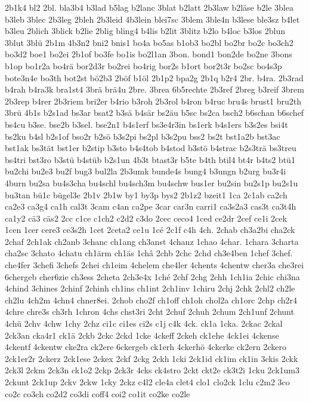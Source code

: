 {2b1k4
bl2
2bl.
bla3b4
b3lad
b5lag
b2lanc
3blat
b2latt
2b3law
b2läse
b2le
3blea
b3leb
3blec
2b3leg
2bleh
2b3leid
4b3lein
blei7sc
3blem
3ble4n
b3lese
ble3sz
b4let
b3leu
2blich
3blick
b2lie
2blig
bling4
b4lis
b2lit
3blitz
b2lo
b4loc
b3los
2blun
3blut
3blü
2b1m
4b3n2
bni2
bnis1
bo4a
bo5as
b1ob3
bo2bl
bo2br
bo2c
bo3ch2
bo3d2
boe1
bo2ei
2b1of
bo3fe
bo1is
bo2l1an
3bon.
bond1
bon2de
bo2ne
3bons
b1op
bo1r2a
bo4rä
bor2d3r
bo2rei
bo4rig
bor2s
b1ort
bor2t3r
bo2sc
bo4s3p
bote3n4e
bo3th
bot2st
bö2b3
2böf
b1öl
2b1p2
bpa2g
2b1q
b2r4
2br.
b4ra.
2b3rad
b4rah
b4ra3k
bra1st4
3brä
brä4u
2bre.
3brea
6b5rechte
2b3ref
2breg
b3reif
3brem
2b3rep
b4rer
2b3riem
bri2er
b4rio
b3roh
2b3rol
b4ron
b4ruc
bru4s
brust1
bru2th
3brü
4b1s
b2s1ad
bs3ar
bsat2
b3sä
b4sär
bs2äu
b5sc
bs2ca
bsch2
b6schan
b6schef
bs4cu
b3se.
bse2b
b3sel.
bse2n1
b4s1erf
bs3e4r3in
bs1erk
b4s1ers
b3s2es
bsi4t
bs2ku
b4sl
b2s1of
bso2r
b2sö
b3s2pi
bs2pl
b3s2pu
bss2
bs2t
bst1a2b
bst3ac
bst1ak
bs3tät
bst1er
b2stip
b3sto
b4s4tob
b4stod
b3stö
b4strac
b2s3trä
bs3treu
bs4tri
bst3ro
b3stü
b4stüb
b2s1un
4b3t
btast3r
b5te
b4th
btil4
bt4r
b4ts2
btü1
bu2chi
bu2e3
bu2f
bug3
bul2la
2b3umk
bunde4s
bung4
b3ungn
b2urg
bu3r4i
4burn
bu2sa
bu4s3cha
bu4schl
bu4sch3m
bu4schw
bus1er
bu2sin
bu2s1p
bu2s1u
bu3tan
bü1c
bügel3e
2b1v
2b1w
by1
by3p
bys2
2b1z2
bzeit1
1ca
2c1ab
ca2ch
ca2e3
ca3g4
ca1h
cal3t
3cam
c4an
ca2pe
3car
car3n
carri1
ca3s2a3
cas3t
ca3t4h
ca1y2
cä3
cäs2
2cc
c1ce
c1ch2
c2d2
c3do
2cec
ceco4
1ced
ce2dr
2cef
ce1i
2cek
1cen
1cer
cere3
ce3s2h
1cet
2ceta2
ce1u
1cé
2c1f
c4h
4ch.
2chab
ch3a2bi
cha2ck
2chaf
2ch1ak
ch2anb
3chanc
ch1ang
ch3anst
4chanz
1chao
4char.
1chara
3charta
cha2sc
3chato
4chatu
ch1ärm
ch1äs
1châ
2chb
2chc
2chd
ch3e4ben
1chef
3chef.
che4fer
3chefi
3chefs
2chei
ch1eim
4chelem
che4ler
4chents
4chentw
cher3a
che3rei
6chergeb
cher6zie
ch3ess
2cheta
2ch3e4x
1ché
2chf
2chg
2chh
1ch1ia
2chic
chi3na
4chind
3chines
2chinf
2chinh
ch1ins
ch1int
2ch1inv
1chiru
2chj
2chk
2chl2
ch2le
ch2lu
4ch2m
4chn4
chner8ei.
2chob
cho2f
ch1off
ch1oh
chol2a
ch1orc
2chp
ch2r4
4chre
chre3s
ch3rh
1chron
4chs
chst3ri
2cht
2chuf
2chuh
2chum
2ch1unf
2chunt
4chü
2chv
4chw
1chy
2chz
ci1c
ci1es
ci2s
c1j
c4k
4ck.
ck1a
1cka.
2ckac
2ckal
2ck3an
cka4r1
ck1ä
2ckb
2ckc
2ckd
1cke
4ckeff
2ckeh
ck1ehe
4ck1ei
4ckense
4ckentf
4ckentw
cke2ra
ck2ere
6ckergeb
ck1erh
4ckerhö
4ckerke
ck2ern
2ckero
2ck1er2r
2ckerz
2ck1ese
2ckex
2ckf
2ckg
2ckh
1cki
2ck1id
ck1im
ck1in
3ckis
2ckk
2ck3l
2ckm
2ck3n
ck1o2
2ckp
2ck3r
4cks
ck4stro
2ckt
ckt2e
ck3t2i
1cku
2ck1um3
2ckunt
2ck1up
2ckv
2ckw
1cky
2ckz
c4l2
cle4a
clet4
clo1
clo2ck
1clu
c2m2
3co
co2c
co3ch
co2d2
co3di
coff4
coi2
co1it
co2ke
co2le
}
